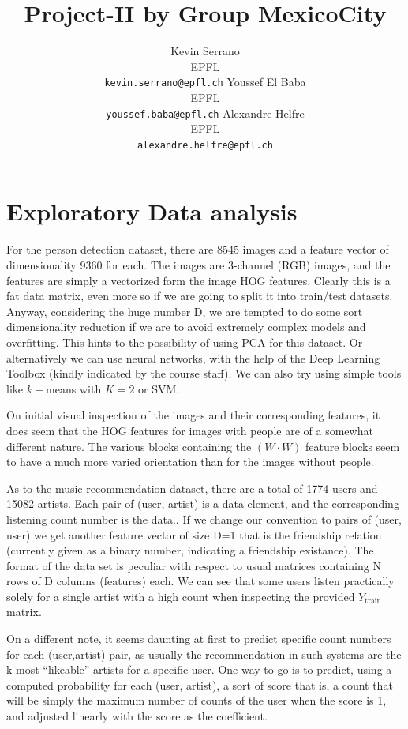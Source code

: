 \documentclass{article} %
\title{Project-II by Group MexicoCity}
\author{
Kevin Serrano\\EPFL\\
\texttt{kevin.serrano@epfl.ch} \And Youssef El Baba\\EPFL\\
\texttt{youssef.baba@epfl.ch} \And Alexandre Helfre\\EPFL\\
\texttt{alexandre.helfre@epfl.ch}
}
\begin{document}
\maketitle

\begin{abstract}

\end{abstract}

\section{Exploratory Data analysis}
\label{sec:datadescr}
For the person detection dataset, there are 8545 images and a feature vector of dimensionality 9360 for each. The images are 3-channel (RGB) images, and the features are simply a vectorized form the image HOG features. Clearly this is a fat data matrix, even more so if we are going to split it into train/test datasets. Anyway, considering the huge number D, we are tempted to do some sort dimensionality reduction if we are to avoid extremely complex models and overfitting. This hints to the possibility of using PCA for this dataset. Or alternatively we can use neural networks, with the help of the Deep Learning Toolbox (kindly indicated by the course staff). We can also try using simple tools like $k-$means with $K = 2$ or SVM.

On initial visual inspection of the images and their corresponding features, it does seem that the HOG features for images with people are of a somewhat different nature. The various blocks containing the $(W \cdot W)$ feature blocks seem to have a much more varied orientation than for the images without people.

As to the music recommendation dataset, there are a total of 1774 users and 15082 artists. Each pair of (user, artist) is a data element, and the corresponding listening count number is the data.. If we change our convention to pairs of (user, user) we get another feature vector of size D=1 that is the friendship relation (currently given as a binary number, indicating a friendship existance). The format of the data set is peculiar with respect to usual matrices containing N rows of D columns (features) each. We can see that some users listen practically solely for a single artist with a high count when inspecting the provided $Y_{\text{train}}$ matrix.

On a different note, it seems daunting at first to predict specific count numbers for each (user,artist) pair, as usually the recommendation in such systems are the k most “likeable” artists for a specific user. One way to go is to predict, using a computed probability for each (user, artist), a sort of score that is, a count that will be simply the maximum number of counts of the user when the score is 1, and adjusted linearly with the score as the coefficient.
\end{document}
